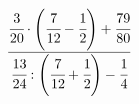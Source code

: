 \begin{ex}[type=calculate]
	\begin{condition}
		\( \dfrac{\cfrac{3}{20}\cdot\left( \cfrac{7}{12}-\cfrac{1}{2} \right)+\cfrac{79}{80}}{\cfrac{13}{24}:\left( \cfrac{7}{12}+\cfrac{1}{2} \right)-\cfrac{1}{4}} \)
	\end{condition}
\end{ex}